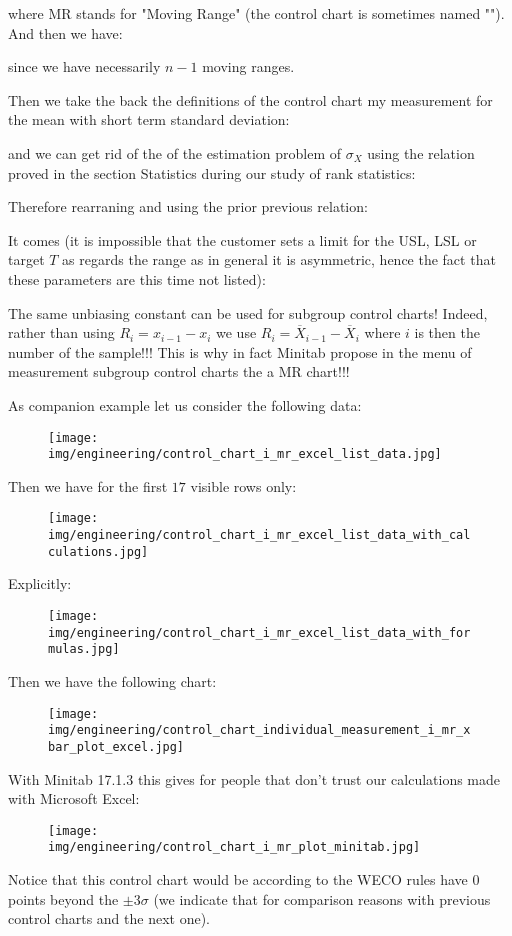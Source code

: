 	where MR stands for "Moving Range" (the control chart is sometimes named ""). And then we have:
	
	since we have necessarily $n-1$ moving ranges.

	Then we take the back the definitions of the control chart my measurement for the mean with short term standard deviation:
	
	and we can get rid of the of the estimation problem of $\sigma_X$ using the relation proved in the section Statistics during our study of rank statistics:
	
	Therefore rearraning and using the prior previous relation:
	
	It comes (it is impossible that the customer sets a limit for the USL, LSL or target $T$ as regards the range as in general it is asymmetric, hence the fact that these parameters are this time not listed):
	
	\begin{tcolorbox}[title=Remark,colframe=black,arc=10pt]
	The same unbiasing constant can be used for subgroup control charts! Indeed, rather than using $R_i=x_{i-1}-x_i$ we use $R_i=\overline{X}_{i-1}-\overline{X}_i$ where $i$ is then the number of the sample!!! This is why in fact Minitab propose in the menu of measurement subgroup control charts the a MR chart!!!
	\end{tcolorbox}
	As companion example let us consider the following data:
	\begin{figure}[H]
		\centering
		\texttt{[image: img/engineering/control\_chart\_i\_mr\_excel\_list\_data.jpg]}
	\end{figure}
	Then we have for the first $17$ visible rows only:
	\begin{figure}[H]
		\centering
		\texttt{[image: img/engineering/control\_chart\_i\_mr\_excel\_list\_data\_with\_calculations.jpg]}
	\end{figure}
	Explicitly:
	\begin{figure}[H]
		\centering
		\texttt{[image: img/engineering/control\_chart\_i\_mr\_excel\_list\_data\_with\_formulas.jpg]}
	\end{figure}
	Then we have the following chart:
	\begin{figure}[H]
		\centering
		\texttt{[image: img/engineering/control\_chart\_individual\_measurement\_i\_mr\_xbar\_plot\_excel.jpg]}
	\end{figure}
	With Minitab 17.1.3 this gives for people that don't trust our calculations made with Microsoft Excel:
	\begin{figure}[H]
		\centering
		\texttt{[image: img/engineering/control\_chart\_i\_mr\_plot\_minitab.jpg]}
	\end{figure}
	Notice that this control chart would be according to the WECO rules have $0$ points beyond the $\pm 3\sigma$ (we indicate that for comparison reasons with previous control charts and the next one).
	
